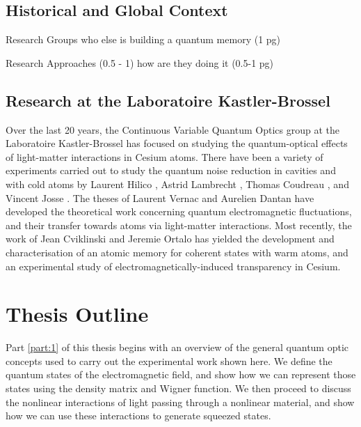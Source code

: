 \subsection*{Historical and Global Context}


Research Groups
who else is building a quantum memory (1 pg)

Research Approaches (0.5 - 1)
how are they doing it  (0.5-1 pg)





\subsection*{Research at the Laboratoire Kastler-Brossel}

Over the last 20 years, the Continuous Variable Quantum Optics group at the Laboratoire Kastler-Brossel has focused on studying the quantum-optical effects of light-matter interactions in Cesium atoms.  There have been a variety of experiments carried out to study the quantum noise reduction in cavities and with cold atoms by Laurent Hilico \cite{HilicoPhD}, Astrid Lambrecht \cite{LambrechtPhD}, Thomas Coudreau \cite{CoudreauPhD}, and Vincent Josse \cite{JossePhD}.  The theses of Laurent Vernac \cite{VernacPhD} and Aurelien Dantan \cite{DantanPhD} have developed the theoretical work concerning quantum electromagnetic fluctuations, and their transfer towards atoms via light-matter interactions.  Most recently, the work of Jean Cviklinski \cite{CviklinskiPhD} and Jeremie Ortalo \cite{ortalo} has yielded the development and characterisation of an atomic memory for coherent states with warm atoms, and an experimental study of electromagnetically-induced transparency in Cesium.

 

\newpage
\section*{Thesis Outline}

Part \ref{part:1} of this thesis begins with an overview of the general quantum optic concepts used to carry out the experimental work shown here.  We define the quantum states of the electromagnetic field, and show how we can represent those states using the density matrix and Wigner function.  We then proceed to discuss the nonlinear interactions of light passing through a nonlinear material, and show how we can use these interactions to generate squeezed states.

